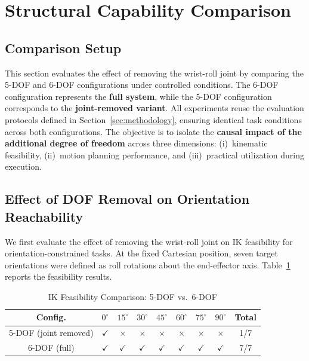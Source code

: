 \documentclass[conference]{IEEEtran}
\begin{document}
	
	\section{Structural Capability Comparison}
	\label{sec:dof_comparison}
	
	\subsection{Comparison Setup}
	
	This section evaluates the effect of removing the wrist-roll joint by
	comparing the 5-DOF and 6-DOF configurations under controlled
	conditions. The 6-DOF configuration represents the \textbf{full
		system}, while the 5-DOF configuration corresponds to the
	\textbf{joint-removed variant}. All experiments reuse the evaluation
	protocols defined in Section~\ref{sec:methodology}, ensuring identical
	task conditions across both configurations. The objective is to isolate
	the \textbf{causal impact of the additional degree of freedom} across
	three dimensions: (i)~kinematic feasibility, (ii)~motion planning
	performance, and (iii)~practical utilization during execution.
	
	\subsection{Effect of DOF Removal on Orientation Reachability}
	
	We first evaluate the effect of removing the wrist-roll joint on IK
	feasibility for orientation-constrained tasks. At the fixed Cartesian
	position, seven target orientations were defined as roll rotations
	about the end-effector axis. Table~\ref{tab:ik_ablation} reports the
	feasibility results.
	
	\begin{table}[t]
		\centering
		\caption{IK Feasibility Comparison: 5-DOF vs.\ 6-DOF}
		\label{tab:ik_ablation}
		\begin{tabular}{c|ccccccc|c}
			\hline
			\textbf{Config.} & $0^\circ$ & $15^\circ$ & $30^\circ$ & $45^\circ$ & $60^\circ$ & $75^\circ$ & $90^\circ$ & \textbf{Total} \\
			\hline
			5-DOF (joint removed) & $\checkmark$ & $\times$ & $\times$ & $\times$ & $\times$ & $\times$ & $\times$ & 1/7 \\
			6-DOF (full)          & $\checkmark$ & $\checkmark$ & $\checkmark$ & $\checkmark$ & $\checkmark$ & $\checkmark$ & $\checkmark$ & 7/7 \\
			\hline
		\end{tabular}
	\end{table}
	
\end{document}
